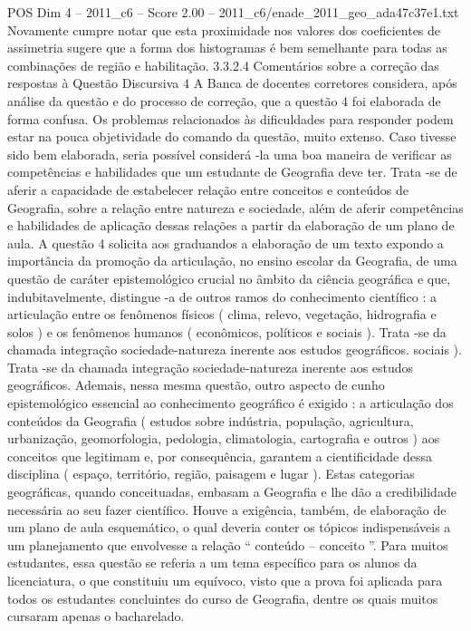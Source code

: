 \begin{textsample}{POS Dim 4 – 2011\_c6 – Score 2.00 – 2011\_c6/enade\_2011\_geo\_ada47c37e1.txt}
Novamente cumpre notar que esta proximidade nos valores dos coeficientes de assimetria sugere que a forma dos histogramas é bem semelhante para todas as combinações de região e habilitação. 3.3.2.4 Comentários sobre a correção das respostas à Questão Discursiva 4 A Banca de docentes corretores considera, após análise da questão e do processo de correção, que a questão 4 foi elaborada de forma confusa.
Os problemas relacionados às dificuldades para responder podem estar na pouca objetividade do comando da questão, muito extenso.
Caso tivesse sido bem elaborada, seria possível considerá -la uma boa maneira de verificar as competências e habilidades que um estudante de Geografia deve ter.
Trata -se de aferir a capacidade de estabelecer relação entre conceitos e conteúdos de Geografia, sobre a relação entre natureza e sociedade, além de aferir competências e habilidades de aplicação dessas relações a partir da elaboração de um plano de aula.
A questão 4 solicita aos graduandos a elaboração de um texto expondo a importância da promoção da articulação, no ensino escolar da Geografia, de uma questão de caráter epistemológico crucial no âmbito da ciência geográfica e que, indubitavelmente, distingue -a de outros ramos do conhecimento científico : a articulação entre os fenômenos físicos ( clima, relevo, vegetação, hidrografia e solos ) e os fenômenos humanos ( econômicos, políticos e sociais ).
Trata -se da chamada integração sociedade-natureza inerente aos estudos geográficos. sociais ).
Trata -se da chamada integração sociedade-natureza inerente aos estudos geográficos.
Ademais, nessa mesma questão, outro aspecto de cunho epistemológico essencial ao conhecimento geográfico é exigido : a articulação dos conteúdos da Geografia ( estudos sobre indústria, população, agricultura, urbanização, geomorfologia, pedologia, climatologia, cartografia e outros ) aos conceitos que legitimam e, por consequência, garantem a cientificidade dessa disciplina ( espaço, território, região, paisagem e lugar ).
Estas categorias geográficas, quando conceituadas, embasam a Geografia e lhe dão a credibilidade necessária ao seu fazer científico.
Houve a exigência, também, de elaboração de um plano de aula esquemático, o qual deveria conter os tópicos indispensáveis a um planejamento que envolvesse a relação “ conteúdo – conceito ”.
Para muitos estudantes, essa questão se referia a um tema específico para os alunos da licenciatura, o que constituiu um equívoco, visto que a prova foi aplicada para todos os estudantes concluintes do curso de Geografia, dentre os quais muitos cursaram apenas o bacharelado.

\end{textsample}
